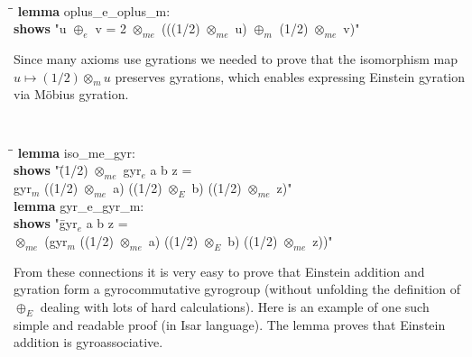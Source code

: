 \documentclass[a4paper]{article}
\newcommand{\tab}{\hspace{5mm}}
\theoremstyle{definition}
\begin{document}
{\tt
\begin{small}
\begin{tabbing}
  \tab\=\tab\=\kill
{\bf lemma} oplus\_e\_oplus\_m:\\
\> {\bf  shows} "u $\oplus_e$ v = 2 $\otimes_{me}$ (((1/2) $\otimes_{me}$ u) $\oplus_m$ (1/2) $\otimes_{me}$ v)"
\end{tabbing}
\end{small}
}


Since many axioms use gyrations we needed to prove that the
isomorphism map $u \mapsto (1/2)\otimes_m u$ preserves gyrations,
which enables expressing Einstein gyration via M\"obius gyration.

{\tt
\begin{small}
  \begin{tabbing}
\tab\=\tab\=\kill
{\bf lemma} iso\_me\_gyr:\\
\> {\bf shows} "\=(1/2) $\otimes_{me}$ gyr$_e$ a b z =\\
\>\>gyr$_m$ ((1/2) $\otimes_{me}$ a) ((1/2) $\otimes_E$ b) ((1/2) $\otimes_{me}$ z)"\\
{\bf lemma} gyr\_e\_gyr\_m:\\
\> {\bf shows} "\= gyr$_e$ a b z =\\
\> $\otimes_{me}$ (gyr$_m$ ((1/2) $\otimes_{me}$ a) ((1/2) $\otimes_E$ b) ((1/2) $\otimes_{me}$ z))"
\end{tabbing}
\end{small}
}


From these connections it is very easy to prove that Einstein addition
and gyration form a gyrocommutative gyrogroup (without unfolding the
definition of $\oplus_E$ dealing with lots of hard calculations).
Here is an example of one such simple and readable proof (in Isar
language). The lemma proves that Einstein addition is gyroassociative.
\end{document}
